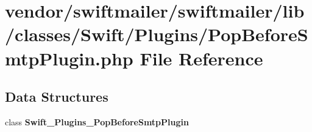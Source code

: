 \section{vendor/swiftmailer/swiftmailer/lib/classes/\+Swift/\+Plugins/\+Pop\+Before\+Smtp\+Plugin.php File Reference}
\label{_pop_before_smtp_plugin_8php}
\subsection*{Data Structures}
\begin{DoxyCompactItemize}
\item 
class {\bf Swift\+\_\+\+Plugins\+\_\+\+Pop\+Before\+Smtp\+Plugin}
\end{DoxyCompactItemize}
